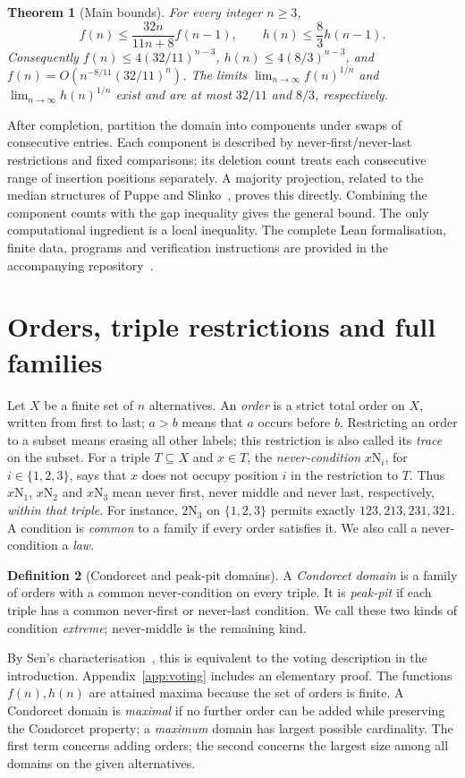 \documentclass[11pt,letterpaper]{article}
\newtheorem{theorem}{Theorem}[section]
\theoremstyle{definition}
\newtheorem{definition}[theorem]{Definition}
\newcommand{\N}[2]{#1\mathrm N_{#2}}
\begin{document}
\begin{theorem}[Main bounds]\label{thm:main}
For every integer \(n\geq3\),
\[
 f(n)\leq\frac{32n}{11n+8}f(n-1),\qquad
 h(n)\leq\frac83h(n-1).
\]
Consequently \(f(n)\leq4(32/11)^{n-3}\),
\(h(n)\leq4(8/3)^{n-3}\), and
\(f(n)=O(n^{-8/11}(32/11)^n)\).
The limits \(\lim_{n\to\infty}f(n)^{1/n}\) and
\(\lim_{n\to\infty}h(n)^{1/n}\) exist and are at most \(32/11\)
and \(8/3\), respectively.
\end{theorem}

After completion, partition the domain into components under swaps
of consecutive entries. Each component is described by never-first/never-last
restrictions and fixed comparisons; its deletion count treats each
consecutive range of insertion positions separately. A majority projection,
related to the median structures of Puppe and Slinko~\cite{PuppeSlinko},
proves this directly. Combining the component counts with the gap
inequality gives the general bound. The only computational ingredient is
a local inequality. The complete Lean formalisation, finite data,
programs and verification instructions are provided in the accompanying
repository~\cite{LeanRepository}.

\clearpage
\section{Orders, triple restrictions and full families}\label{sec:objects}
Let \(X\) be a finite set of \(n\) alternatives. An \emph{order} is
a strict total order on \(X\), written from first to last; \(a>b\)
means that \(a\) occurs before \(b\). Restricting
an order to a subset means erasing all other labels; this restriction is
also called its \emph{trace} on the subset.
For a triple \(T\subseteq X\) and \(x\in T\), the \emph{never-condition}
\(\N{x}{i}\), for \(i\in\{1,2,3\}\), says that \(x\) does not occupy position \(i\) in the
restriction to \(T\). Thus \(\N{x}{1}\), \(\N{x}{2}\) and
\(\N{x}{3}\) mean never first, never middle and never last,
respectively, \emph{within that triple}. For instance, \(\N23\) on
\(\{1,2,3\}\) permits exactly \(123,213,231,321\).
A condition is \emph{common} to a family if every order satisfies it.
We also call a never-condition a \emph{law}.

\begin{definition}[Condorcet and peak-pit domains]\label{def:cd}
A \emph{Condorcet domain} is a family of orders with a common
never-condition on every triple. It is \emph{peak-pit} if each triple
has a common never-first or never-last condition. We call these two
kinds of condition \emph{extreme}; never-middle is the remaining kind.
\end{definition}
By Sen's characterisation~\cite{Sen}, this is equivalent to the voting
description in the introduction. Appendix~\ref{app:voting} includes
an elementary proof. The functions \(f(n),h(n)\) are attained maxima
because the set of orders is finite. A Condorcet domain is \emph{maximal}
if no further order can be added while preserving the Condorcet property;
a \emph{maximum} domain has largest possible cardinality. The first term concerns adding orders; the second concerns
the largest size among all domains on the given alternatives.
\end{document}
